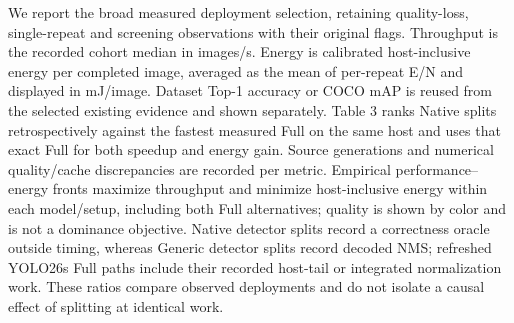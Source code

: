 We report the broad measured deployment selection, retaining quality-loss, single-repeat and screening observations with their original flags. Throughput is the recorded cohort median in images/\allowbreak{}s. Energy is calibrated host-inclusive energy per completed image, averaged as the mean of per-repeat E/\allowbreak{}N and displayed in mJ/\allowbreak{}image. Dataset Top-1 accuracy or COCO mAP is reused from the selected existing evidence and shown separately. Table 3 ranks Native splits retrospectively against the fastest measured Full on the same host and uses that exact Full for both speedup and energy gain. Source generations and numerical quality/\allowbreak{}cache discrepancies are recorded per metric. Empirical performance--energy fronts maximize throughput and minimize host-inclusive energy within each model/\allowbreak{}setup, including both Full alternatives; quality is shown by color and is not a dominance objective. Native detector splits record a correctness oracle outside timing, whereas Generic detector splits record decoded NMS; refreshed YOLO26s Full paths include their recorded host-tail or integrated normalization work. These ratios compare observed deployments and do not isolate a causal effect of splitting at identical work.
